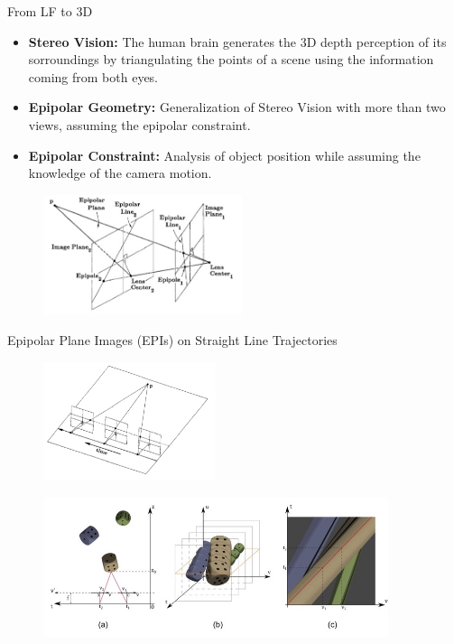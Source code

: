 \begin{frame}{From LF to 3D}
\begin{block}{}
\begin{itemize}
\item \textbf{Stereo Vision:} The human brain generates the 3D depth perception of its sorroundings by triangulating the points of a scene using the information coming from both eyes.

\pause
\item \textbf{Epipolar Geometry:} Generalization of Stereo Vision with more than two views, assuming the epipolar constraint.

\pause
\item \textbf{Epipolar Constraint:} Analysis of object position while assuming the knowledge of the camera motion.
\end{itemize}
\end{block}
\begin{figure}[h!]
\centering
\includegraphics[width=0.52\textwidth]{./images/epipolarline.jpg}
\end{figure}
 
\end{frame}

\begin{frame}{Epipolar Plane Images (EPIs) on Straight Line Trajectories}
\begin{figure}[h!]
\centering
\includegraphics[width=0.45\textwidth]{./images/perp-move.jpg}
\end{figure}

\begin{figure}[h!]
\centering
\includegraphics[width=0.90\textwidth]{./images/EPI-dices.jpg}
\end{figure}
\end{frame}


